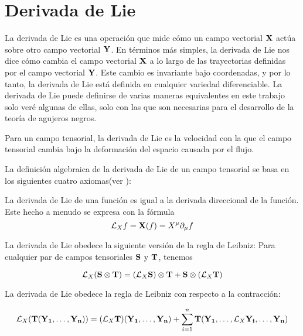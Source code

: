 \section{Derivada de Lie}
La derivada de Lie es una operación que mide cómo un campo vectorial $\mathbf{X}$ actúa sobre otro campo vectorial $\mathbf{Y}$. En términos más simples, la derivada de Lie nos dice cómo cambia el campo vectorial $\mathbf{X}$ a lo largo de las trayectorias definidas por el campo vectorial $\mathbf{Y}$. Este cambio es invariante bajo coordenadas, y por lo tanto, la derivada de Lie está definida en cualquier variedad diferenciable.
La derivada de Lie puede definirse de varias maneras equivalentes en este trabajo solo veré algunas de ellas, solo con las que son necesarias para el desarrollo de la teoría de agujeros negros.

Para un campo tensorial, la derivada de Lie es la velocidad con la que el campo tensorial cambia bajo la deformación del espacio causada por el flujo.

La definición algebraica de la derivada de Lie de un campo tensorial se basa en los siguientes cuatro axiomas(ver \cite{Lie}):

\begin{axiom}\label{ax:Lie1}
    La derivada de Lie de una función es igual a la derivada direccional de la función. Este hecho a menudo se expresa con la fórmula
    \begin{equation}
    \mathcal{L}_X f = \mathbf{X}(f) = X^\mu \partial_\mu f        
    \end{equation}
    
\end{axiom}

\begin{axiom}\label{ax:Lie2}
    La derivada de Lie obedece la siguiente versión de la regla de Leibniz: Para cualquier par de campos tensoriales ${\mathbf{S}}$ y ${\mathbf{T}}$, tenemos

        \begin{equation}
        \mathcal{L}_X({\mathbf{S}} \otimes {\ensuremath{\mathbf{T}}}) = (\mathcal{L}_X {\mathbf{S}}) \otimes {\ensuremath{\mathbf{T}}} + {\mathbf{S}} \otimes (\mathcal{L}_X {\mathbf{T}})            
        \end{equation}
        
\end{axiom}

\begin{axiom}\label{ax:Lie3}
    La derivada de Lie obedece la regla de Leibniz con respecto a la contracción:
    
        \begin{equation}
        \mathcal{L}_X({\mathbf{T}}({\mathbf{Y_1}}, \ldots, {\mathbf{Y_n}})) = (\mathcal{L}_X {\mathbf{T}})({\mathbf{Y_1}}, \ldots, {\mathbf{Y_n}}) + \sum_{i=1}^n {\mathbf{T}}({\mathbf{Y_1}}, \ldots, \mathcal{L}_X {\mathbf{Y_i}}, \ldots, {\mathbf{Y_n}})
        \end{equation}
        
\end{axiom}

